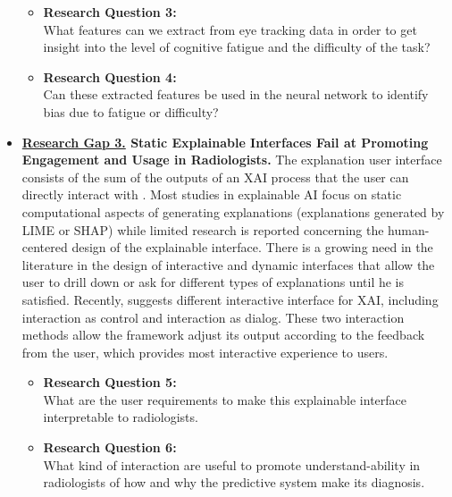 \begin{itemize}
          \begin{itemize}
              \item \textbf{Research Question 3:} \\ What features can we extract from eye tracking data in order to get insight into the level of cognitive fatigue and the difficulty of the task?
              \item \textbf{Research Question 4:} \\ Can these extracted features be used in the neural network to identify bias due to fatigue or difficulty?
          \end{itemize}
    \item \textbf{\underline{Research Gap 3.} Static Explainable Interfaces Fail at Promoting Engagement and Usage in Radiologists.} The explanation user interface consists of the sum of the outputs of an XAI process that the user can directly interact with \citep{Chromik2021}. Most studies in explainable AI focus on static computational aspects of generating explanations (explanations generated by LIME or SHAP) while limited research is reported concerning the human-centered design of the explainable interface. There is a growing need in the literature in the design of interactive and dynamic interfaces that allow the user to drill down or ask for different types of explanations until he is satisfied. Recently, \citet{Chromik2021} suggests different interactive interface for XAI, including interaction as control and interaction as dialog. These two interaction methods allow the framework adjust its output according to the feedback from the user, which provides most interactive experience to users.  
          \begin{itemize}
              \item \textbf{Research Question 5:} \\ What are the user requirements to make this explainable interface interpretable to radiologists.
              \item \textbf{Research Question 6:} \\ What kind of interaction are useful to promote understand-ability in radiologists of how and why the predictive system make its diagnosis.
          \end{itemize}
\end{itemize}




